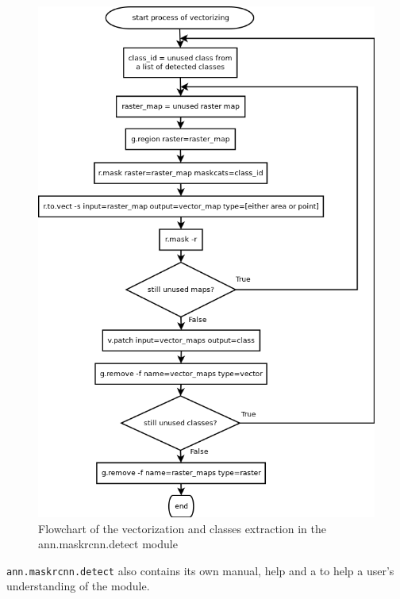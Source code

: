 \begin{figure}[H]
   \centering
	\includegraphics[width=0.95\linewidth]{./pictures/vectorize.png}
	\caption[vectorization in ann.maskrcnn.detect flowchart]{Flowchart of the vectorization and classes extraction in the ann.maskrcnn.detect module}
      \label{fig:vectorize}
\end{figure}

\verb|ann.maskrcnn.detect| also contains its own manual, help and a  to 
help a user's understanding of the module.

